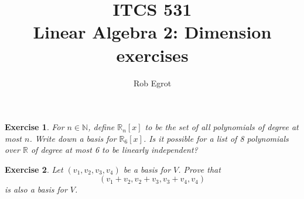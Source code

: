 \documentclass{article}
\title{ITCS 531 \\Linear Algebra 2: Dimension exercises}
\author{Rob Egrot}
\date{}
\theoremstyle{plain}
\newtheorem{Q}{Exercise}{\bfseries}{\upshape}
\newcommand{\bN}{\mathbb{N}}
\newcommand{\bR}{\mathbb{R}}
\begin{document}
\maketitle

\begin{Q}\label{\prefix Q:LA2pol}
For $n\in \bN$, define $\bR_n[x]$ to be the set of all polynomials of degree at most $n$. Write down a basis for $\bR_6[x]$. Is it possible for a list of 8 polynomials over $\bR$ of degree at most 6 to be linearly independent?
\end{Q}
\begin{comment}
\textbf{Solution:}
We can use $(1,x,x^2,\ldots,x^6)$. It is not possible for a list of 8 polynomials of degree at most 6 to be linearly independent. To prove, this notice that we have shown that there is a spanning set of 7 elements, and by proposition 2.4 a linearly independent list can't be bigger than a spanning list.
\end{comment}

\begin{Q}
Let $(v_1,v_2,v_3,v_4)$ be a basis for $V$. Prove that 
\[(v_1+ v_2, v_2+ v_3, v_3+v_4, v_4)\] 
is also a basis for $V$. 
\end{Q}
\begin{comment}
\textbf{Solution:}
By theorem \ref{T:span_ind}, a linearly independent list with the right size is also a basis. Since $(v_1+ v_2, v_2+ v_3, v_3+v_4, v_4)$ has the right size, we just need to show it is linearly independent (alternatively we could show it spans). Suppose
\[a_1(v_1+ v_2)+ a_2(v_2+ v_3) + a_3(v_3+v_4) + a_4v_4 = 0.\]
Then
\[a_1v_1 + (a_1+a_2)v_2 + (a_2+a_3)v_3 + (a_3+a_4)v_4 = 0,\]
and, as $(v_1,v_2,v_3,v_4)$ is linearly independent, it follows that $a_1 = (a_1+a_2) = (a_2+a_3) = (a_3+a_4) = 0$. From this we easily see that $a_i = 0$ for all $i=1,2,3,4$. Thus $(v_1+ v_2, v_2+ v_3, v_3+v_4, v_4)$ is linearly independent as required.
\end{comment}
\end{document}
